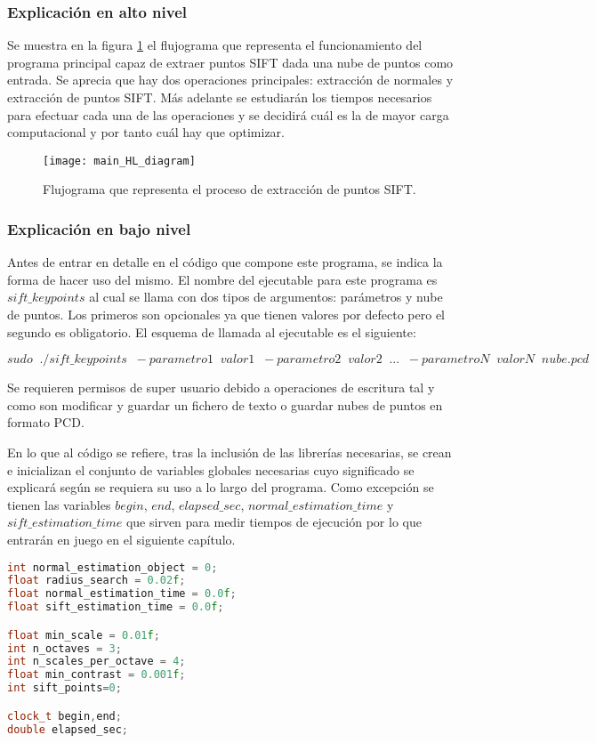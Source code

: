 \subsubsection{Explicación en alto nivel}
Se muestra en la figura \ref{fig:main_HL_diagram} el flujograma que representa el funcionamiento del programa principal capaz de extraer puntos SIFT dada una nube de puntos como entrada. Se aprecia que hay dos operaciones principales: extracción de normales y extracción de puntos SIFT. Más adelante se estudiarán los tiempos necesarios para efectuar cada una de las operaciones y se decidirá cuál es la de mayor carga computacional y por tanto cuál hay que optimizar.

\begin{figure}
\centering
\texttt{[image: main\_HL\_diagram]}
\caption{Flujograma que representa el proceso de extracción de puntos SIFT.}\label{fig:main_HL_diagram}
\end{figure}

\subsubsection{Explicación en bajo nivel}
Antes de entrar en detalle en el código que compone este programa, se indica la forma de hacer uso del mismo. 
El nombre del ejecutable para este programa es $sift\_keypoints$ al cual se llama con dos tipos de argumentos: parámetros y nube de puntos. Los primeros son opcionales ya que tienen valores por defecto pero el segundo es obligatorio. El esquema de llamada al ejecutable es el siguiente:

$$sudo \;\; ./sift\_keypoints \;\; -parametro1 \;\; valor1 \;\; -parametro2 \;\; valor2 \;\; ... \;\; -parametroN \;\; valorN \;\; nube.pcd$$

Se requieren permisos de super usuario debido a operaciones de escritura tal y como son modificar y guardar un fichero de texto o guardar nubes de puntos en formato PCD.


En lo que al código se refiere, tras la inclusión de las librerías necesarias, se crean e inicializan el conjunto de variables globales necesarias cuyo significado se explicará según se requiera su uso a lo largo del programa. Como excepción se tienen las variables $begin$, $end$, $elapsed\_sec$, $normal\_estimation\_time$ y $sift\_estimation\_time$ que sirven para medir tiempos de ejecución por lo que entrarán en juego en el siguiente capítulo.

\begin{lstlisting}[language=C++,breaklines]
int normal_estimation_object = 0;
float radius_search = 0.02f;
float normal_estimation_time = 0.0f;
float sift_estimation_time = 0.0f;

float min_scale = 0.01f;
int n_octaves = 3;
int n_scales_per_octave = 4;
float min_contrast = 0.001f;
int sift_points=0; 

clock_t begin,end;
double elapsed_sec;
\end{lstlisting}

